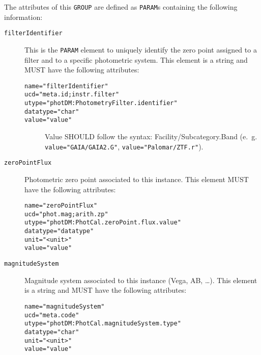 \documentclass[11pt,a4paper]{ivoa} 
\let\fg=\color
\def\elem#1{{\tt{\fg{DarkRed}#1}}}
\def\attrval#1#2{{\tt{\fg{DarkRed}#1}="{\fg{DarkPurple}#2}"}}
\begin{document}
The attributes of this \elem{GROUP} are defined as \elem{PARAM}s
containing the following information:
\begin{description}
\item[\elem{filterIdentifier}] This is the \elem{PARAM} element to
  uniquely identify the zero point assigned to a filter and to a
  specific photometric system. This element is a string and MUST
  have the following attributes:
\begin{description}
    \item[\attrval{name}{filterIdentifier}]
    \item[\attrval{ucd}{meta.id;instr.filter}]
    \item[\attrval{utype}{photDM:PhotometryFilter.identifier}]
    \item[\attrval{datatype}{char}]
    \item[\attrval{value}{value}] Value SHOULD follow the syntax:
      Facility/Subcategory.Band (e.~g. \attrval{value}{GAIA/GAIA2.G},
      \attrval{value}{Palomar/ZTF.r}).
\end{description}
\item[\elem{zeroPointFlux}] Photometric zero point associated to this
  instance. This element MUST have the following attributes:
\begin{description}
    \item[\attrval{name}{zeroPointFlux}]
    \item[\attrval{ucd}{phot.mag;arith.zp}]
    \item[\attrval{utype}{photDM:PhotCal.zeroPoint.flux.value}]
    \item[\attrval{datatype}{datatype}]
    \item[\attrval{unit}{<unit>}]
    \item[\attrval{value}{value}]
\end{description}
\item[\elem{magnitudeSystem}] Magnitude system associated to this
  instance (Vega, AB, \dots). This element is a string and MUST have the
  following attributes:
\begin{description}
    \item[\attrval{name}{magnitudeSystem}]
    \item[\attrval{ucd}{meta.code}]
    \item[\attrval{utype}{photDM:PhotCal.magnitudeSystem.type}]
    \item[\attrval{datatype}{char}]
    \item[\attrval{unit}{<unit>}]
    \item[\attrval{value}{value}]

\end{description}
\end{description}
\end{document}
